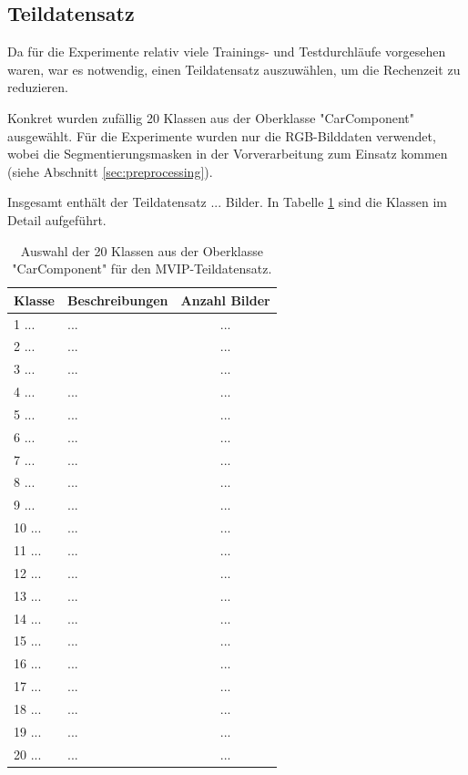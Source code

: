\subsection{Teildatensatz} \label{sec:subdataset}

Da für die Experimente relativ viele Trainings- und Testdurchläufe vorgesehen waren, war es notwendig, einen Teildatensatz auszuwählen, um die Rechenzeit zu reduzieren.

Konkret wurden zufällig 20 Klassen aus der Oberklasse "CarComponent" ausgewählt. Für die Experimente wurden nur die RGB-Bilddaten verwendet, wobei die Segmentierungsmasken in der Vorverarbeitung zum Einsatz kommen (siehe Abschnitt \ref{sec:preprocessing}).

Insgesamt enthält der Teildatensatz ... Bilder. In Tabelle \ref{tab:subdataset} sind die Klassen im Detail aufgeführt.

\begin{table}[]
	\caption{Auswahl der 20 Klassen aus der Oberklasse "CarComponent" für den MVIP-Teildatensatz.}
	\begin{tabular}{|l|l|c|}
		\hline
		\textbf{Klasse} & \textbf{Beschreibungen} & \textbf{Anzahl Bilder} \\
		\hline
		1 ... & ... & ... \\
		2 ... & ... & ... \\
		3 ... & ... & ... \\
		4 ... & ... & ... \\
		5 ... & ... & ... \\
		6 ... & ... & ... \\
		7 ... & ... & ... \\
		8 ... & ... & ... \\
		9 ... & ... & ... \\
		10 ... & ... & ... \\
		11 ... & ... & ... \\
		12 ... & ... & ... \\
		13 ... & ... & ... \\
		14 ... & ... & ... \\
		15 ... & ... & ... \\
		16 ... & ... & ... \\
		17 ... & ... & ... \\
		18 ... & ... & ... \\
		19 ... & ... & ... \\
		20 ... & ... & ... \\
		\hline
	\end{tabular}
	\label{tab:subdataset}
\end{table}

